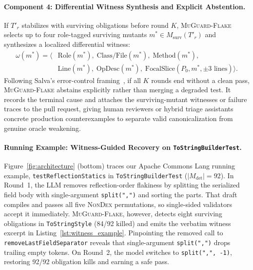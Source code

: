 \paragraph{Component 4: Differential Witness Synthesis and Explicit Abstention.}
If $T'_r$ stabilizes with surviving obligations before round $K$, \textsc{MuGuard-Flake} selects up to four role-tagged surviving mutants $m^* \in M_{\text{surv}}(T'_r)$ and synthesizes a localized differential witness:
\begin{equation}
\label{eq:witness}
\begin{aligned}
\omega(m^*) = \big\langle & \text{Role}(m^*),\; \text{Class/File}(m^*),\; \text{Method}(m^*), \\
                          & \text{Line}(m^*),\; \text{OpDesc}(m^*),\; \text{FocalSlice}(P_0, m^*, \pm 3\text{ lines}) \big\rangle.
\end{aligned}
\end{equation}
Following Salva's error-control framing~\cite{salva2026nltestrunner}, if all $K$ rounds end without a clean pass, \textsc{MuGuard-Flake} abstains explicitly rather than merging a degraded test. It records the terminal cause and attaches the surviving-mutant witnesses or failure traces to the pull request, giving human reviewers or hybrid triage assistants concrete production counterexamples to separate valid canonicalization from genuine oracle weakening.

\paragraph{Running Example: Witness-Guided Recovery on \texttt{ToStringBuilderTest}.}
Figure~\ref{fig:architecture} (bottom) traces our Apache Commons Lang running example, \texttt{testReflectionStatics} in \texttt{ToStringBuilderTest} ($|M_{\text{det}}| = 92$). In Round~1, the LLM removes reflection-order flakiness by splitting the serialized field body with single-argument \texttt{split(",")} and sorting the parts. That draft compiles and passes all five \textsc{NonDex} permutations, so single-sided validators accept it immediately. \textsc{MuGuard-Flake}, however, detects eight surviving obligations in \texttt{ToStringStyle} (84/92 killed) and emits the verbatim witness excerpt in Listing~\ref{lst:witness_example}. Pinpointing the removed call to \texttt{removeLastFieldSeparator} reveals that single-argument \texttt{split(",")} drops trailing empty tokens. On Round~2, the model switches to \texttt{split(",", -1)}, restoring 92/92 obligation kills and earning a safe pass.

